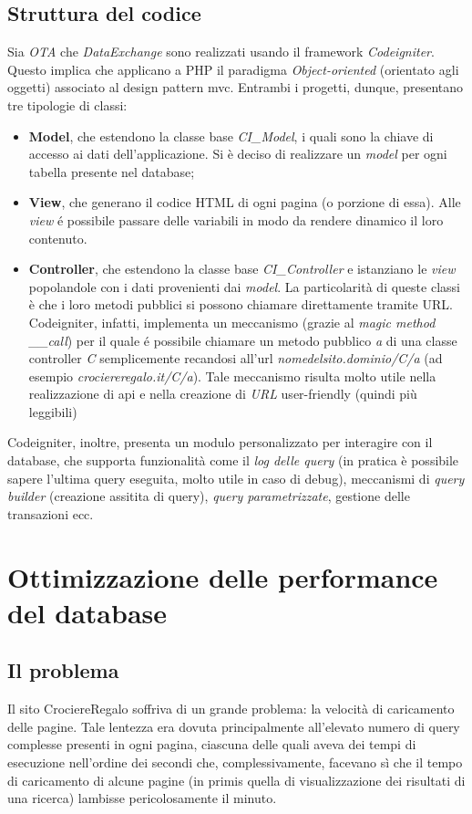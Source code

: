 \subsection{Struttura del codice}
\label{section:struttura-codice}
Sia \textit{OTA} che \textit{DataExchange} sono realizzati usando il framework \textit{Codeigniter}. Questo implica che applicano a PHP il paradigma \textit{Object-oriented} (orientato agli oggetti) associato al design pattern \gls{mvc}. Entrambi i progetti, dunque, presentano tre tipologie di classi:
\begin{itemize}
	\item \textbf{Model}, che estendono la classe base \textit{CI\_Model}, i quali sono la chiave di accesso ai dati dell'applicazione. Si è deciso di realizzare un \textit{model} per ogni tabella presente nel database;
	\item \textbf{View}, che generano il codice HTML di ogni pagina (o porzione di essa). Alle \textit{view} é possibile passare delle variabili in modo da rendere dinamico il loro contenuto.
	\item \textbf{Controller}, che estendono la classe base \textit{CI\_Controller} e istanziano le \textit{view} popolandole con i dati provenienti dai \textit{model}. La particolarità di queste classi è che i loro metodi pubblici si possono chiamare direttamente tramite URL. Codeigniter, infatti, implementa un meccanismo (grazie al \textit{magic method \_\_call}) per il quale é possibile chiamare un metodo pubblico \textit{a} di una classe controller \textit{C} semplicemente recandosi all'url \textit{nomedelsito.dominio/C/a} (ad esempio \textit{crociereregalo.it/C/a}). Tale meccanismo risulta molto utile nella realizzazione di \gls{api} e nella creazione di \textit{URL} user-friendly (quindi più leggibili)
\end{itemize} 
Codeigniter, inoltre, presenta un modulo personalizzato per interagire con il database, che supporta funzionalità come il \textit{log delle query} (in pratica è possibile sapere l'ultima query eseguita, molto utile in caso di debug), meccanismi di \textit{query builder} (creazione assitita di query), \textit{query parametrizzate}, gestione delle transazioni ecc.

\section{Ottimizzazione delle performance del database}
\subsection{Il problema}
Il sito CrociereRegalo soffriva di un grande problema: la velocità di caricamento delle pagine. Tale lentezza era dovuta principalmente all'elevato numero di query complesse presenti in ogni pagina, ciascuna delle quali aveva dei tempi di esecuzione nell'ordine dei secondi che, complessivamente, facevano sì che il tempo di caricamento di alcune pagine (in primis quella di visualizzazione dei risultati di una ricerca) lambisse pericolosamente il minuto.
